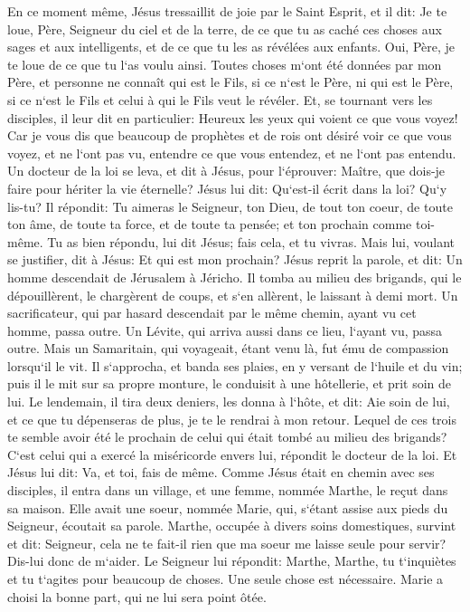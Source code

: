 \verse En ce moment même, Jésus tressaillit de joie par le Saint Esprit, et il dit: Je te loue, Père, Seigneur du ciel et de la terre, de ce que tu as caché ces choses aux sages et aux intelligents, et de ce que tu les as révélées aux enfants. Oui, Père, je te loue de ce que tu l`as voulu ainsi. 
\verse Toutes choses m`ont été données par mon Père, et personne ne connaît qui est le Fils, si ce n`est le Père, ni qui est le Père, si ce n`est le Fils et celui à qui le Fils veut le révéler. 
\verse Et, se tournant vers les disciples, il leur dit en particulier: Heureux les yeux qui voient ce que vous voyez! 
\verse Car je vous dis que beaucoup de prophètes et de rois ont désiré voir ce que vous voyez, et ne l`ont pas vu, entendre ce que vous entendez, et ne l`ont pas entendu. 
\verse Un docteur de la loi se leva, et dit à Jésus, pour l`éprouver: Maître, que dois-je faire pour hériter la vie éternelle? 
\verse Jésus lui dit: Qu`est-il écrit dans la loi? Qu`y lis-tu? 
\verse Il répondit: Tu aimeras le Seigneur, ton Dieu, de tout ton coeur, de toute ton âme, de toute ta force, et de toute ta pensée; et ton prochain comme toi-même. 
\verse Tu as bien répondu, lui dit Jésus; fais cela, et tu vivras. 
\verse Mais lui, voulant se justifier, dit à Jésus: Et qui est mon prochain? 
\verse Jésus reprit la parole, et dit: Un homme descendait de Jérusalem à Jéricho. Il tomba au milieu des brigands, qui le dépouillèrent, le chargèrent de coups, et s`en allèrent, le laissant à demi mort. 
\verse Un sacrificateur, qui par hasard descendait par le même chemin, ayant vu cet homme, passa outre. 
\verse Un Lévite, qui arriva aussi dans ce lieu, l`ayant vu, passa outre. 
\verse Mais un Samaritain, qui voyageait, étant venu là, fut ému de compassion lorsqu`il le vit. 
\verse Il s`approcha, et banda ses plaies, en y versant de l`huile et du vin; puis il le mit sur sa propre monture, le conduisit à une hôtellerie, et prit soin de lui. 
\verse Le lendemain, il tira deux deniers, les donna à l`hôte, et dit: Aie soin de lui, et ce que tu dépenseras de plus, je te le rendrai à mon retour. 
\verse Lequel de ces trois te semble avoir été le prochain de celui qui était tombé au milieu des brigands? 
\verse C`est celui qui a exercé la miséricorde envers lui, répondit le docteur de la loi. Et Jésus lui dit: Va, et toi, fais de même. 
\verse Comme Jésus était en chemin avec ses disciples, il entra dans un village, et une femme, nommée Marthe, le reçut dans sa maison. 
\verse Elle avait une soeur, nommée Marie, qui, s`étant assise aux pieds du Seigneur, écoutait sa parole. 
\verse Marthe, occupée à divers soins domestiques, survint et dit: Seigneur, cela ne te fait-il rien que ma soeur me laisse seule pour servir? Dis-lui donc de m`aider. 
\verse Le Seigneur lui répondit: Marthe, Marthe, tu t`inquiètes et tu t`agites pour beaucoup de choses. 
\verse Une seule chose est nécessaire. Marie a choisi la bonne part, qui ne lui sera point ôtée. 

